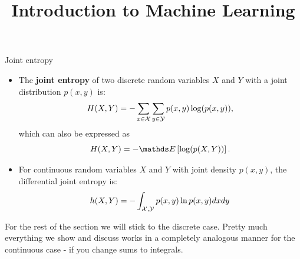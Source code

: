 



\newcommand{\titlefigure}{figure_man/entropy.png}
\newcommand{\learninggoals}{
  \item Know the joint entropy
  \item Know conditional entropy as remaining uncertainty 
  \item Know mutual information as the amount of information of an RV obtained by another
}

\title{Introduction to Machine Learning}
\date{}





\begin{vbframe}{Joint entropy}
\begin{itemize}
  \item The \textbf{joint entropy} of two discrete random variables $X$ and $Y$ with a joint distribution $p(x, y)$ is:
  $$ H(X,Y) = -\sum_{x \in \mathcal{X}} \sum_{y \in \mathcal{Y}}  p(x,y) \log(p(x,y)),$$ 
  which can also be expressed as $$ H(X,Y) = -\E \left[ \log(p(X,Y)) \right].$$
  \item For continuous random variables $X$ and $Y$ with joint density $p(x,y)$, the differential joint entropy is:\\
  $$ h(X,Y) = - \int_{\mathcal{X},\mathcal{Y}} p(x,y) \ln p(x,y) dx dy$$
\end{itemize}

\begin{footnotesize}
For the rest of the section we will stick to the discrete case. Pretty much everything we show and discuss works in a completely analogous manner for the continuous case - if you change sums to integrals.
\end{footnotesize}

\end{vbframe}


